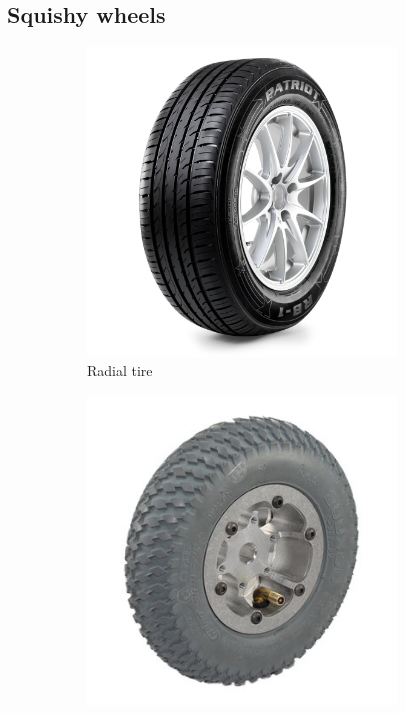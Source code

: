 \documentclass[10pt,letterpaper]{book}
\begin{document}
	\subsection{Squishy wheels}	
	
	\begin{figure}[H]
		\begin{subfigure}[b]{.19\linewidth}
			\includegraphics[width=0.9\textwidth]{imgs/tire_radial.jpeg}
			\caption{Radial tire}
		\end{subfigure}\begin{subfigure}[b]{.19\linewidth}
			\includegraphics[width=0.9\textwidth]{imgs/tire_tubed.jpeg}

\end{subfigure}
\end{figure}
\end{document}
